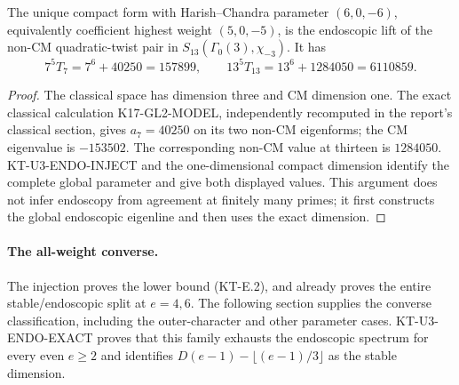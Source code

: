 \begin{corollary}
The unique compact form with Harish--Chandra parameter
$(6,0,-6)$, equivalently coefficient highest weight
$(5,0,-5)$, is the endoscopic lift of the non-CM quadratic-twist
pair in $S_{13}(\Gamma_0(3),\chi_{-3})$.
It has
\[
  7^5T_7=7^6+40250=157899,
  \qquad
  13^5T_{13}=13^6+1284050=6110859.
\]
\end{corollary}
\begin{proof}
The classical space has dimension three and CM dimension one.
The exact classical calculation K17-GL2-MODEL, independently
recomputed in the report's classical section, gives $a_7=40250$
on its two non-CM eigenforms; the CM eigenvalue is $-153502$.
The corresponding non-CM value at thirteen is $1284050$.
KT-U3-ENDO-INJECT and the one-dimensional compact dimension
identify the complete global parameter and give both displayed
values. This argument does not infer endoscopy from agreement
at finitely many primes; it first constructs the global
endoscopic eigenline and then uses the exact dimension.
\end{proof}

\paragraph{The all-weight converse.}
The injection proves the lower bound (KT-E.2), and already
proves the entire stable/endoscopic split at $e=4,6$.
The following section supplies the converse classification,
including the outer-character and other parameter cases.
KT-U3-ENDO-EXACT proves that this family exhausts the endoscopic
spectrum for every even $e\ge2$ and identifies
$D(e-1)-\lfloor(e-1)/3\rfloor$ as the stable dimension.
